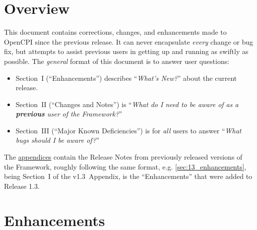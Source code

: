\section*{Overview}
This document contains corrections, changes, and enhancements made to OpenCPI since the previous release. It can never encapsulate \textit{every} change or bug fix, but attempts to assist previous users in getting up and running as swiftly as possible. The \textit{general} format of this document is to answer user questions:
\begin{itemize}
\item Section~I (``Enhancements'') describes ``\textit{What's New?}'' about the current release.
\item Section~II (``Changes and Notes'') is ``\textit{What do I need to be aware of as a \textbf{previous} user of the Framework?}''
\item Section~III (``Major Known Deficiencies'') is for \textit{all} users to answer ``\textit{What bugs should I be aware of?}''
\end{itemize}
The \href{sec:appendices}{appendices} contain the Release Notes from previously released versions of the Framework, roughly following the same format, e.g. \ref{sec:13_enhancements}, being Section~I of the v1.3~Appendix, is the ``Enhancements'' that were added to Release 1.3.

\iffalse
\section{Enhancements}
\section{Changes and Notes}
\section{Major Known Deficiencies}
\label{sec:XX_bugs}
\subsection{Previously Documented Deficiencies}
\fi

\def\ocpiversion{latest}  %
\section{Enhancements}

